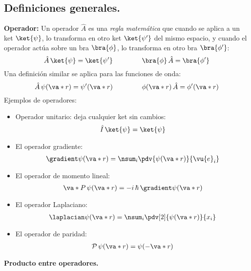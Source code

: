 \subsection{Definiciones generales.}

\textbf{Operador: } Un operador $\hat{A}$ es una \emph{regla matemática} que cuando se aplica a un ket $\ket{\psi}$, lo transforma en otro ket $\ket{\psi^{\prime}}$ del mismo espacio, y cuando el operador actúa sobre un bra $\bra{\phi}$, lo transforma en otro bra $\bra{\phi^{\prime}}$:
\begin{equation}
\hat{A} \, \ket{\psi} = \ket{\psi^{\prime}} \hspace{1.5cm} \bra{\phi} \, \hat{A} = \bra{\phi^{\prime}}
\label{eq:ecuacion_02_51}
\end{equation}
Una definición similar se aplica para las funciones de onda:
\begin{equation}
\hat{A} \, \psi(\va*{r}) =  \psi^{\prime} (\va*{r}) \hspace{1.5cm} \phi(\va*{r}) \, \hat{A} =  \phi^{\prime} (\va*{r})
\label{eq:ecuacion_02_52}
\end{equation}
Ejemplos de operadores:
\begin{itemize}
\item Operador unitario: deja cualquier ket sin cambios:
\begin{align*}
\hat{I} \, \ket{\psi} = \ket{\psi}
\end{align*}
\item El operador gradiente:
\begin{align*}
\gradient \psi(\va*{r}) = \nsum_{i} \pdv{\psi(\va*{r})}{\vu{e}_{i}}
\end{align*}
\item El operador de momento lineal:
\begin{align*}
\va*{P} \, \psi(\va*{r}) =  - i \, \hbar \, \gradient \psi(\va*{r})
\end{align*}
\item El operador Laplaciano:
\begin{align*}
\laplacian \psi(\va*{r}) = \nsum_{i} \pdv[2]{\psi(\va*{r})}{x_{i}}
\end{align*}
\item El operador de paridad:
\begin{align*}
\mathcal{P} \, \psi(\va*{r}) = \psi(- \va*{r}) 
\end{align*}
\end{itemize}

\textbf{Producto entre operadores.}


